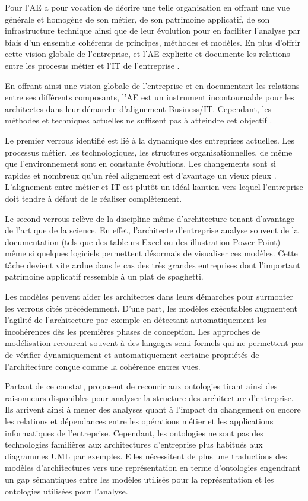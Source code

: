 	Pour \cite{lankhorst2013enterprise} l'AE a pour vocation de décrire une telle organisation en offrant une vue générale et homogène de son métier, de son patrimoine applicatif, de son infrastructure technique ainsi que de leur évolution pour en faciliter l'analyse par biais d'un ensemble cohérents de principes, méthodes et modèles. En plus d'offrir cette vision globale de l'entreprise, et  l'AE explicite et documente les relations entre les procesus métier et l'IT de l'entreprise \cite{kaisler_enterprise_2005}. 
	
	En offrant ainsi une vision globale de l'entreprise et en documentant les relations entre ses différents composants, l'AE est un instrument incontournable pour les architectes dans leur démarche d'alignement Business/IT. Cependant, les méthodes et techniques actuelles ne suffisent pas à atteindre cet objectif \cite{barn2013enterprise}. 
	
	Le premier verrous identifié est lié à la dynamique des entreprises actuelles. Les processus métier, les technologiques, les structures organisationnelles, de même que l'environnement sont en constante évolutions. Les changements sont si rapides et nombreux qu'un réel alignement est d'avantage un vieux pieux \cite{lankhorst2013enterprise}. L'alignement entre métier et IT est plutôt un idéal kantien vers lequel l'entreprise doit tendre à défaut de le réaliser complètement.
	
	Le second verrous relève de la discipline même d'architecture tenant d'avantage de l'art que de la science. En effet, l'architecte d'entreprise analyse souvent de la documentation (tels que des tableurs Excel ou des illustration Power Point) même si quelques logiciels permettent désormais de visualiser ces modèles. Cette tâche devient vite ardue dans le cas des très grandes entreprises dont l'important patrimoine applicatif ressemble à un plat de spaghetti.
	
	Les modèles peuvent aider les architectes dans leurs démarches pour surmonter les verrous cités précédemment. D'une part, les modèles exécutables augmentent l'agilité de l'architecture par exemple en détectant automatiquement les incohérences dès les premières phases de conception. Les approches de modélisation recourent souvent à des langages semi-formels qui ne permettent pas de vérifier dynamiquement et automatiquement certaine propriétés de l'architecture conçue comme la cohérence entres vues. 
	
	Partant de ce constat, \cite{sunkle_analyzing_2013} proposent de recourir aux ontologies tirant ainsi des raisonneurs disponibles pour analyser la structure des architecture d'entreprise. Ils arrivent ainsi à mener des analyses quant à l'impact du changement ou encore les relations et dépendances entre les opérations métier et les applications informatiques de l'entreprise. Cependant, les ontologies ne sont pas des technologies familières aux architectures d'entreprise plus habitués aux diagrammes UML par exemples. Elles nécessitent de plus une traductions des modèles d'architectures vers une représentation en terme d'ontologies engendrant un gap sémantiques entre les modèles utilisés pour la représentation et les ontologies utilisées pour l'analyse.
	
